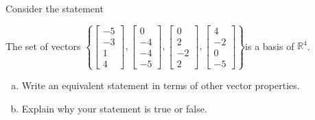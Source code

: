 
\begin{exerciseStatement}


Consider the statement 
\begin{center}\begin{minipage}{0.8\textwidth}
 The set of vectors \( \left\{ \left[\begin{array}{c}
-5 \\
-3 \\
1 \\
4
\end{array}\right] , \left[\begin{array}{c}
0 \\
-4 \\
-4 \\
-5
\end{array}\right] , \left[\begin{array}{c}
0 \\
2 \\
-2 \\
2
\end{array}\right] , \left[\begin{array}{c}
4 \\
-2 \\
0 \\
-5
\end{array}\right] \right\} \)is a basis of \(\mathbb{R}^4\). 
\end{minipage}\end{center}
    


\begin{enumerate}[(a)]
\item  Write an equivalent statement in terms of other vector properties.
\item  Explain why your statement is true or false.
\end{enumerate}
    
\end{exerciseStatement}
    
